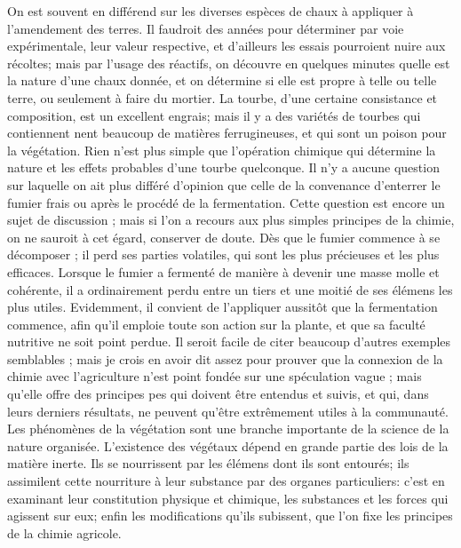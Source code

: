 On est souvent en différend sur les diverses espèces de chaux à appliquer à l’amendement des terres. Il faudroit des années pour déterminer par voie expérimentale, leur valeur respective, et d’ailleurs les essais pourroient nuire aux récoltes; mais par l’usage des réactifs, on découvre en quelques minutes quelle est la nature d’une chaux donnée, et on détermine si elle est propre à telle ou telle terre, ou seulement à faire du mortier.
La tourbe, d’une certaine consistance et composition, est un excellent engrais; mais il y a des variétés de tourbes qui contiennent\setcounter{page}{332} nent beaucoup de matières ferrugineuses, et qui sont un poison pour la végétation. Rien n'est plus simple que l'opération chimique qui détermine la nature et les effets probables d'une tourbe quelconque. Il n'y a aucune question sur laquelle on ait plus différé d'opinion que celle de la convenance d'enterrer le fumier frais ou après le procédé de la fermentation. Cette question est encore un sujet de discussion ; mais si l'on a recours aux plus simples principes de la chimie, on ne sauroit à cet égard, conserver de doute. Dès que le fumier commence à se décomposer ; il perd ses parties volatiles, qui sont les plus précieuses et les plus efficaces. Lorsque le fumier a fermenté de manière à devenir une masse molle et cohérente, il a ordinairement perdu entre un tiers et une moitié de ses élémens les plus utiles. Evidemment, il convient de l'appliquer aussitôt que la fermentation commence, afin qu'il emploie toute son action sur la plante, et que sa faculté nutritive ne soit point perdue. Il seroit facile de citer beaucoup d'autres exemples semblables ; mais je crois en avoir dit assez pour prouver que la connexion de la chimie avec l'agriculture n'est point fondée sur une spéculation vague ; mais qu'elle offre des principes\setcounter{page}{333} pes qui doivent être entendus et suivis, et qui, dans leurs derniers résultats, ne peuvent qu'être extrêmement utiles à la communauté. Les phénomènes de la végétation sont une branche importante de la science de la nature organisée. L'existence des végétaux dépend en grande partie des lois de la matière inerte. Ils se nourrissent par les élémens dont ils sont entourés; ils assimilent cette nourriture à leur substance par des organes particuliers: c'est en examinant leur constitution physique et chimique, les substances et les forces qui agissent sur eux; enfin les modifications qu'ils subissent, que l'on fixe les principes de la chimie agricole.
